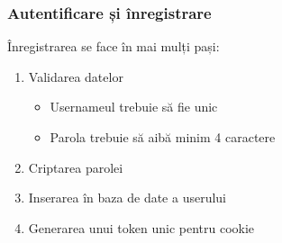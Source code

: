 \newpage
\subsubsection{Autentificare și înregistrare}

Înregistrarea se face în mai mulți pași:
\begin{enumerate}
	\item Validarea datelor
	      \begin{itemize}
		      \item Usernameul trebuie să fie unic
		      \item Parola trebuie să aibă minim 4 caractere
	      \end{itemize}

	\item Criptarea parolei

	\item Inserarea în baza de date a userului

	\item Generarea unui token unic pentru cookie
\end{enumerate}


